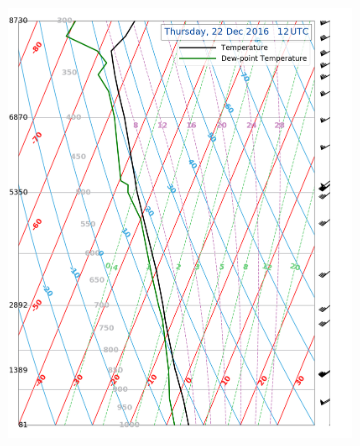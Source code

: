 \begin{landscape}
	\begin{figure}\ContinuedFloat
		\centering
		\begin{subfigure}[b]{0.66\textheight}
			\includegraphics[trim={0cm 0.2cm 2.5cm .5cm},clip,
			width=\textwidth]{./fig_Sounding/20161222_12Z}
			\caption{}\label{fig:Soun22}
		\end{subfigure}
		\quad
		\begin{subfigure}[b]{0.66\textheight}

\end{subfigure}
\end{figure}
\end{landscape}
